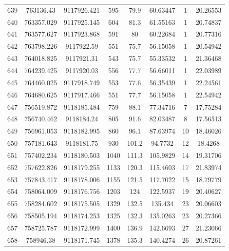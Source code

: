 \begin{longtable}{cccccccc}
639  & 763136.43       & 9117926.421      & 595     & 79.9  & 60.63447 & 1  & 20.26553 \\
640  & 763357.029      & 9117925.145      & 604     & 81.3  & 61.55163 & 1  & 20.74837 \\
641  & 763577.627      & 9117923.868      & 591     & 80    & 60.22684 & 1  & 20.77316 \\
642  & 763798.226      & 9117922.59       & 551     & 75.7  & 56.15058 & 1  & 20.54942 \\
643  & 764018.825      & 9117921.31       & 543     & 75.7  & 55.33532 & 1  & 21.36468 \\
644  & 764239.425      & 9117920.03       & 556     & 77.7  & 56.66011 & 1  & 22.03989 \\
645  & 764460.025      & 9117918.749      & 553     & 77.6  & 56.35439 & 1  & 22.24561 \\
646  & 764680.625      & 9117917.466      & 551     & 77.7  & 56.15058 & 1  & 22.54942 \\
647  & 756519.872      & 9118185.484      & 759     & 88.1  & 77.34716 & 7  & 17.75284 \\
648  & 756740.462      & 9118184.24       & 805     & 91.6  & 82.03487 & 8  & 17.56513 \\
649  & 756961.053      & 9118182.995      & 860     & 96.1  & 87.63974 & 10 & 18.46026 \\
650  & 757181.643      & 9118181.75       & 930     & 101.2 & 94.7732  & 12 & 18.4268  \\
651  & 757402.234      & 9118180.503      & 1040    & 111.3 & 105.9829 & 14 & 19.31706 \\
652  & 757622.826      & 9118179.255      & 1133    & 120.3 & 115.4603 & 17 & 21.83974 \\
653  & 757843.417      & 9118178.006      & 1155    & 121.5 & 117.7022 & 15 & 18.79779 \\
654  & 758064.009      & 9118176.756      & 1203    & 124   & 122.5937 & 19 & 20.40627 \\
655  & 758284.602      & 9118175.505      & 1329    & 132.5 & 135.434  & 23 & 20.06603 \\
656  & 758505.194      & 9118174.253      & 1325    & 132.3 & 135.0263 & 23 & 20.27366 \\
657  & 758725.787      & 9118172.999      & 1400    & 136.9 & 142.6693 & 27 & 21.23066 \\
658  & 758946.38       & 9118171.745      & 1378    & 135.3 & 140.4274 & 26 & 20.87261 \\

\end{longtable}
